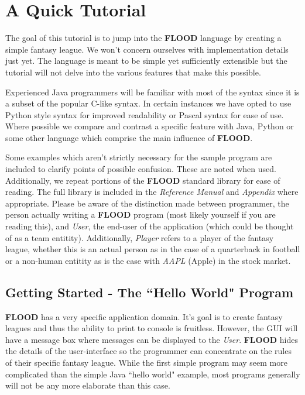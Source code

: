 \documentclass[12pt]{report}
\begin{document}
\chapter{A Quick Tutorial}

The goal of this tutorial is to jump into the \textbf{FLOOD} language by creating a simple fantasy league. We won't concern ourselves with implementation details just yet. The language is meant to be simple yet sufficiently extensible but the tutorial will not delve into the various features that make this possible. 

Experienced Java programmers will be familiar with most of the syntax since it is a subset of the popular C-like syntax. In certain instances we have opted to use Python style syntax for improved readability or Pascal syntax for ease of use. Where possible we compare and contrast a specific feature with Java, Python or some other language which comprise the main influence of \textbf{FLOOD}. 

Some examples which aren't strictly necessary for the sample program are included to clarify points of possible confusion. These are noted when used. Additionally, we repeat portions of the \textbf{FLOOD} standard library for ease of reading. The full library is included in the \textit{Reference Manual} and \textit{Appendix} where appropriate. Please be aware of the distinction made between programmer, the person actually writing a \textbf{FLOOD} program (most likely yourself if you are reading this), and \textit{User}, the end-user of the application (which could be thought of as a team entitity). Additionally, \textit{Player} refers to a player of the fantasy league, whether this is an actual person as in the case of a quarterback in football or a non-human entitity as is the case with \textit{AAPL} (Apple) in the stock market.

\section{Getting Started - The ``Hello World" Program}

\textbf{FLOOD} has a very specific application domain. It's goal is to create fantasy leagues and thus the ability to print to console is fruitless. However, the GUI will have a message box where messages can be displayed to the \textit{User}. \textbf{FLOOD} hides the details of the user-interface so the programmer can concentrate on the rules of their specific fantasy league. While the first simple program may seem more complicated than the simple Java ``hello world" example, most programs generally will not be any more elaborate than this case.
\end{document}
